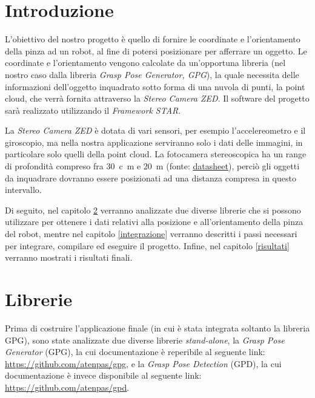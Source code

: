 \documentclass{report}
\begin{document}
\chapter{Introduzione}
L'obiettivo del nostro progetto è quello di fornire le coordinate e l'orientamento della pinza ad un robot, al fine di potersi posizionare per afferrare un oggetto. Le coordinate e l'orientamento vengono calcolate da un'opportuna libreria (nel nostro caso dalla libreria \textit{Grasp Pose Generator, GPG}), la quale necessita delle informazioni dell'oggetto inquadrato sotto forma di una nuvola di punti, la point cloud, che verrà fornita attraverso la \textit{Stereo Camera ZED}. Il software del progetto sarà realizzato utilizzando il \textit{Framework STAR}. \par
La \textit{Stereo Camera ZED} è dotata di vari sensori, per esempio l'accelereometro e il giroscopio, ma nella nostra applicazione serviranno solo i dati delle immagini, in particolare solo quelli della point cloud. La fotocamera stereoscopica ha un range di profondità compreso fra \SI{30}{c\meter} e \SI{20}{\meter} (fonte: \textcolor{blue}{\underline{\href{https://www.stereolabs.com/assets/datasheets/zed2-camera-datasheet.pdf}{datasheet}}}), perciò gli oggetti da inquadrare dovranno essere posizionati ad una distanza compresa in questo intervallo. \par
Di seguito, nel capitolo \ref{librerie} verranno analizzate due diverse librerie che si possono utilizzare per ottenere i dati relativi alla posizione e all'orientamento della pinza del robot, mentre nel capitolo \ref{integrazione} verranno descritti i passi necessari per integrare, compilare ed eseguire il progetto. Infine, nel capitolo \ref{risultati} verranno mostrati i risultati finali.
\newpage
\chapter{Librerie}\label{librerie}
Prima di costruire l'applicazione finale (in cui è stata integrata soltanto la libreria GPG), sono state analizzate due diverse librerie \textit{stand-alone}, la \textit{Grasp Pose Generator} (GPG), la cui documentazione è reperibile al seguente link: \textcolor{blue}{\underline{\url{https://github.com/atenpas/gpg}}}, e la \textit{Grasp Pose Detection} (GPD), la cui documentazione è invece disponibile al seguente link: \textcolor{blue}{\underline{\url{https://github.com/atenpas/gpd}}}.\par
\end{document}
